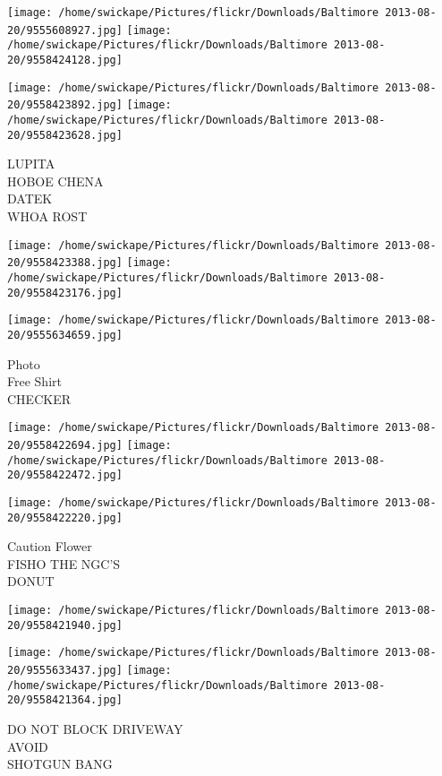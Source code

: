 \documentclass[10pt,letterpaper]{article}
\begin{document}
\texttt{[image: /home/swickape/Pictures/flickr/Downloads/Baltimore 2013-08-20/9555608927.jpg]}
\texttt{[image: /home/swickape/Pictures/flickr/Downloads/Baltimore 2013-08-20/9558424128.jpg]}

\texttt{[image: /home/swickape/Pictures/flickr/Downloads/Baltimore 2013-08-20/9558423892.jpg]}
\texttt{[image: /home/swickape/Pictures/flickr/Downloads/Baltimore 2013-08-20/9558423628.jpg]}

LUPITA\\
HOBOE CHENA\\
DATEK\\
WHOA ROST\\
\pagebreak

\texttt{[image: /home/swickape/Pictures/flickr/Downloads/Baltimore 2013-08-20/9558423388.jpg]}
\texttt{[image: /home/swickape/Pictures/flickr/Downloads/Baltimore 2013-08-20/9558423176.jpg]}

\vspace{0.25in}
\texttt{[image: /home/swickape/Pictures/flickr/Downloads/Baltimore 2013-08-20/9555634659.jpg]}

Photo\\
Free Shirt\\
CHECKER\\
\pagebreak

\texttt{[image: /home/swickape/Pictures/flickr/Downloads/Baltimore 2013-08-20/9558422694.jpg]}
\texttt{[image: /home/swickape/Pictures/flickr/Downloads/Baltimore 2013-08-20/9558422472.jpg]}

\texttt{[image: /home/swickape/Pictures/flickr/Downloads/Baltimore 2013-08-20/9558422220.jpg]}

Caution Flower\\
FISHO THE NGC'S\\
DONUT\\
\pagebreak

\texttt{[image: /home/swickape/Pictures/flickr/Downloads/Baltimore 2013-08-20/9558421940.jpg]}

\vspace{0.25in}
\texttt{[image: /home/swickape/Pictures/flickr/Downloads/Baltimore 2013-08-20/9555633437.jpg]}
\texttt{[image: /home/swickape/Pictures/flickr/Downloads/Baltimore 2013-08-20/9558421364.jpg]}

DO NOT BLOCK DRIVEWAY\\
AVOID\\
SHOTGUN BANG\\
\pagebreak
\end{document}
